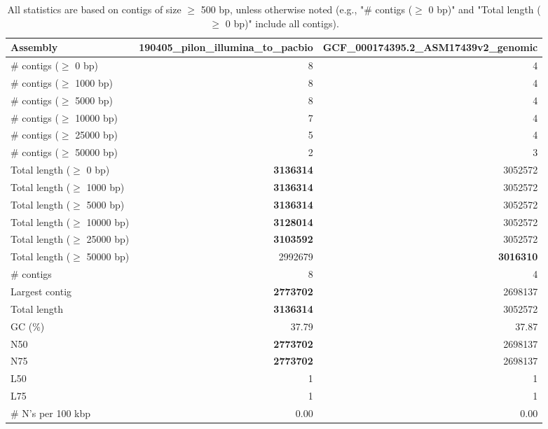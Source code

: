 \documentclass[12pt,a4paper]{article}
\begin{document}
\begin{table}[ht]
\begin{center}
\caption{All statistics are based on contigs of size $\geq$ 500 bp, unless otherwise noted (e.g., "\# contigs ($\geq$ 0 bp)" and "Total length ($\geq$ 0 bp)" include all contigs).}
\begin{tabular}{|l*{2}{|r}|}
\hline
Assembly & 190405\_pilon\_illumina\_to\_pacbio & GCF\_000174395.2\_ASM17439v2\_genomic \\ \hline
\# contigs ($\geq$ 0 bp) & 8 & 4 \\ \hline
\# contigs ($\geq$ 1000 bp) & 8 & 4 \\ \hline
\# contigs ($\geq$ 5000 bp) & 8 & 4 \\ \hline
\# contigs ($\geq$ 10000 bp) & 7 & 4 \\ \hline
\# contigs ($\geq$ 25000 bp) & 5 & 4 \\ \hline
\# contigs ($\geq$ 50000 bp) & 2 & 3 \\ \hline
Total length ($\geq$ 0 bp) & {\bf 3136314} & 3052572 \\ \hline
Total length ($\geq$ 1000 bp) & {\bf 3136314} & 3052572 \\ \hline
Total length ($\geq$ 5000 bp) & {\bf 3136314} & 3052572 \\ \hline
Total length ($\geq$ 10000 bp) & {\bf 3128014} & 3052572 \\ \hline
Total length ($\geq$ 25000 bp) & {\bf 3103592} & 3052572 \\ \hline
Total length ($\geq$ 50000 bp) & 2992679 & {\bf 3016310} \\ \hline
\# contigs & 8 & 4 \\ \hline
Largest contig & {\bf 2773702} & 2698137 \\ \hline
Total length & {\bf 3136314} & 3052572 \\ \hline
GC (\%) & 37.79 & 37.87 \\ \hline
N50 & {\bf 2773702} & 2698137 \\ \hline
N75 & {\bf 2773702} & 2698137 \\ \hline
L50 & 1 & 1 \\ \hline
L75 & 1 & 1 \\ \hline
\# N's per 100 kbp & 0.00 & 0.00 \\ \hline
\end{tabular}
\end{center}
\end{table}
\end{document}
